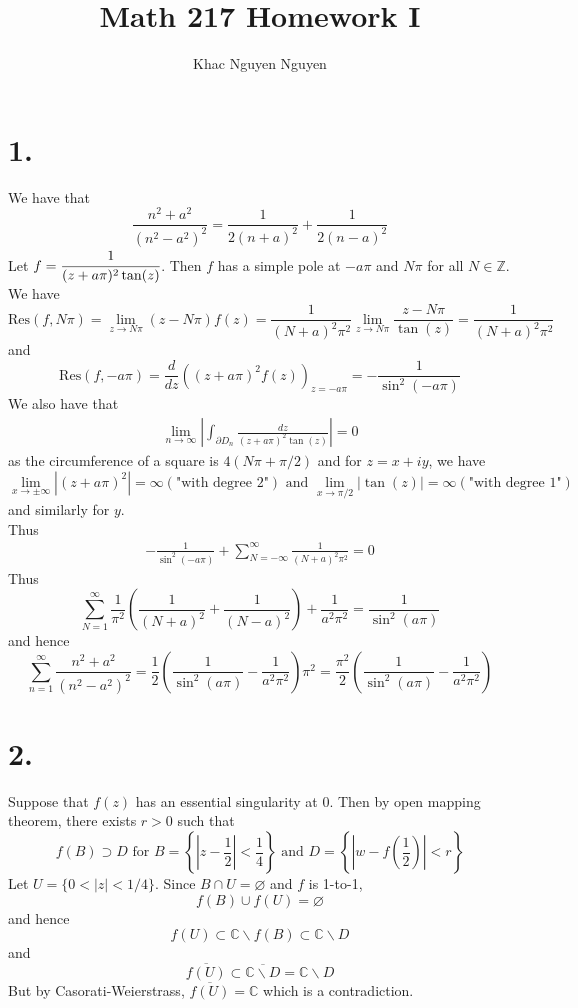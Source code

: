 \documentclass[11pt]{article}
\title{\textbf{Math 217 Homework I}}
\author{Khac Nguyen Nguyen}
\date{}
\begin{document}
\section*{1.}
We have that 
\[
    \frac{n^2+a^2}{(n^2-a^2)^2} = \frac{1}{2(n+a)^2} + \frac{1}{2(n-a)^2}
\]
Let $f = \cfrac{1}{(z+a\pi)^2 \tan(z)}$. Then $f$ has a simple pole at $-a\pi$ and $N\pi$ for all $N \in \mathbb{Z}$. 
We have 
\[
    \text{Res}(f, N\pi) = \lim_{z \to N\pi} (z-N\pi) f(z) = \frac{1}{(N+a)^2 \pi^2} \lim_{z \to N\pi} \frac{z-N\pi}{\tan(z)} = \frac{1}{(N+a)^2 \pi^2}
\]
and 
\[
    \text{Res}(f, -a\pi) = \frac{d}{dz} \left((z+a\pi)^2 f(z)\right)_{z=-a\pi} = -\frac{1}{\sin^2(-a\pi)} 
\]
We also have that 
\begin{align*}
    \lim_{n \to \infty} \left|\int_{\partial D_n} \frac{dz}{(z+a\pi)^2 \tan(z)}\right| = 0 
\end{align*}
as the circumference of a square is $4 (N\pi + \pi/2)$ and for $z = x +iy$, we have 
\[
    \lim_{x \to \pm \infty} |(z+a\pi)^2| = \infty (\text{"with degree 2"}) \text{ and } \lim_{x \to \pi/2} |\tan(z)| = \infty (\text{"with degree 1"})
\]
and similarly for $y$. \\
Thus 
\begin{align*}
    - \frac{1}{\sin^2(-a\pi)} + \sum_{N = -\infty}^\infty \frac{1}{(N+a)^2 \pi^2} = 0
\end{align*}
Thus 
\[
    \sum_{N = 1}^\infty \frac{1}{\pi^2}\left(\frac{1}{(N+a)^2} + \frac{1}{(N-a)^2}\right) + \frac{1}{a^2\pi^2} = \frac{1}{\sin^2(a\pi)}
\]
and hence
\[
    \sum_{n=1}^\infty \frac{n^2+a^2}{(n^2-a^2)^2} = \frac{1}{2} \left(\frac{1}{\sin^2(a\pi)} - \frac{1}{a^2\pi^2}\right) \pi^2 = \frac{\pi^2}{2}\left(\frac{1}{\sin^2(a\pi)} - \frac{1}{a^2\pi^2}\right)
\]
\newpage
\section*{2.}
Suppose that $f(z)$ has an essential singularity at 0. Then by open mapping theorem, there exists $r>0$ such that 
\[
    f(B) \supset D \text{ for } B = \left\{ \left|z-\frac{1}{2}\right| < \frac{1}{4} \right\} \text{ and } D = \left\{\left|w - f\left(\frac{1}{2}\right)\right| < r \right\}
\]
Let $U = \{0 < |z|<1/4\}$. Since $B \cap U = \varnothing$ and $f$ is 1-to-1, 
\[
    f(B) \cup f(U) = \varnothing
\]
and hence
\[
    f(U) \subset \mathbb{C} \backslash f(B) \subset \mathbb{C} \backslash D
\]
and 
\[
    \overline{f(U)} \subset \overline{\mathbb{C} \backslash D} = \mathbb{C} \backslash D
\]
But by Casorati-Weierstrass, $\overline{f(U)} = \mathbb{C}$ which is a contradiction.
\newpage
\end{document}
